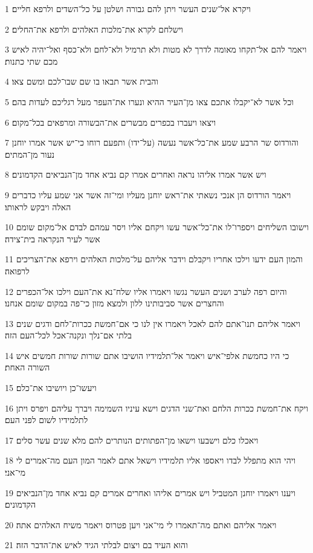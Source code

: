 \par 1 ויקרא אל־שנים העשר ויתן להם גבורה ושלטן על כל־השדים ולרפא חליים׃
\par 2 וישלחם לקרא את־מלכות האלהים ולרפא את־החלים׃
\par 3 ויאמר להם אל־תקחו מאומה לדרך לא מטות ולא תרמיל ולא־לחם ולא־כסף ואל־יהיה לאיש מכם שתי כתנות׃
\par 4 והבית אשר תבאו בו שם שבו־לכם ומשם צאו׃
\par 5 וכל אשר לא־יקבלו אתכם צאו מן־העיר ההיא ונערו את־העפר מעל רגליכם לעדות בהם׃
\par 6 ויצאו ויעברו בכפרים מבשרים את־הבשורה ומרפאים בכל־מקום׃
\par 7 והורדוס שר הרבע שמע את־כל־אשר נעשה (על־ידו) ותפעם רוחו כי־יש אשר אמרו יוחנן נעור מן־המתים׃
\par 8 ויש אשר אמרו אליהו נראה ואחרים אמרו קם נביא אחד מן־הנביאים הקדמונים׃
\par 9 ויאמר הורדוס הן אנכי נשאתי את־ראש יוחנן מעליו ומי־זה אשר אני שמע עליו כדברים האלה ויבקש לראותו׃
\par 10 וישובו השליחים ויספרו־לו את־כל־אשר עשו ויקחם אליו ויסר עמהם לבדם אל־מקום שומם אשר לעיר הנקראה בית־צידה׃
\par 11 והמון העם ידעו וילכו אחריו ויקבלם וידבר אליהם על־מלכות האלהים וירפא את־הצריכים לרפואה׃
\par 12 והיום רפה לערב ושנים העשר נגשו ויאמרו אליו שלח־נא את־העם וילכו אל־הכפרים והחצרים אשר סביבותינו ללון ולמצא מזון כי־פה במקום שומם אנחנו׃
\par 13 ויאמר אליהם תנו־אתם להם לאכל ויאמרו אין לנו כי אם־חמשת ככרות־לחם ודגים שנים בלתי אם־נלך ונקנה־אכל לכל־העם הזה׃
\par 14 כי היו כחמשת אלפי־איש ויאמר אל־תלמידיו הושיבו אתם שורות שורות חמשים איש השורה האחת׃
\par 15 ויעשו־כן ויושיבו את־כלם׃
\par 16 ויקח את־חמשת ככרות הלחם ואת־שני הדגים וישא עיניו השמימה ויברך עליהם ויפרס ויתן לתלמידיו לשום לפני העם׃
\par 17 ויאכלו כלם וישבעו וישאו מן־הפתותים הנותרים להם מלא שנים עשר סלים׃
\par 18 ויהי הוא מתפלל לבדו ויאספו אליו תלמידיו וישאל אתם לאמר המון העם מה־אמרים לי מי־אני׃
\par 19 ויענו ויאמרו יוחנן המטביל ויש אמרים אליהו ואחרים אמרים קם נביא אחד מן־הנביאים הקדמונים׃
\par 20 ויאמר אליהם ואתם מה־תאמרו לי מי־אני ויען פטרוס ויאמר משיח האלהים אתה׃
\par 21 והוא העיד בם ויצום לבלתי הגיד לאיש את־הדבר הזה׃
